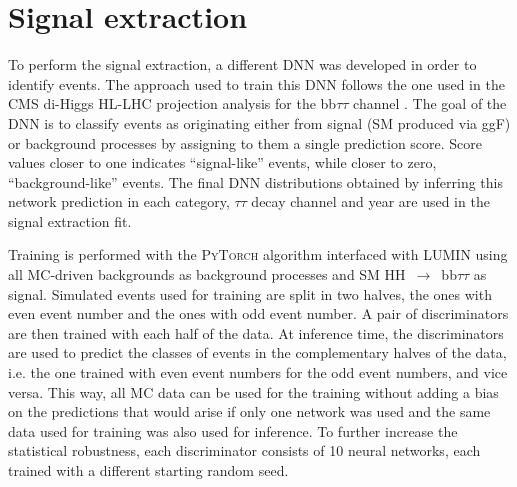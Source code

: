 \documentclass[../main.tex]{subfiles}
\begin{document}
\section{Signal extraction}
\label{hh:sec:signal_extraction}



To perform the signal extraction, a different DNN was developed in order to identify \hhbbtt{} events. The approach used to train this DNN \cite{hh:analysis:gilesdnn} follows the one used in the CMS di-Higgs HL-LHC projection analysis for the bb$\tau\tau$ channel \cite{hh:analysis:hh_hllhc}. The goal of the DNN is to classify events as originating either from signal (SM \hhbbtt{} produced via ggF) or background processes by assigning to them a single prediction score. Score values closer to one indicates ``signal-like'' events, while  closer to zero, ``background-like'' events. The final DNN distributions obtained by inferring this network prediction in each category, $\tau\tau$ decay channel and year are used in the signal extraction fit.

Training is performed with the \textsc{PyTorch} \cite{hh:analysis:pytorch} algorithm interfaced with \textsc{LUMIN} \cite{hh:analysis:lumin} using all MC-driven backgrounds as background processes and SM HH~$\to$~bb$\tau\tau$ as signal. Simulated events used for training are split in two halves, the ones with even event number and the ones with odd event number. A pair of discriminators are then trained with each half of the data. At inference time, the discriminators are used to predict the classes of events in the complementary halves of the data, i.e. the one trained with even event numbers for the odd event numbers, and vice versa. This way, all MC data can be used for the training without adding a bias on the predictions that would arise if only one network was used and the same data used for training was also used for inference. To further increase the statistical robustness, each discriminator consists of 10 neural networks, each trained with a different starting random seed.
\end{document}
